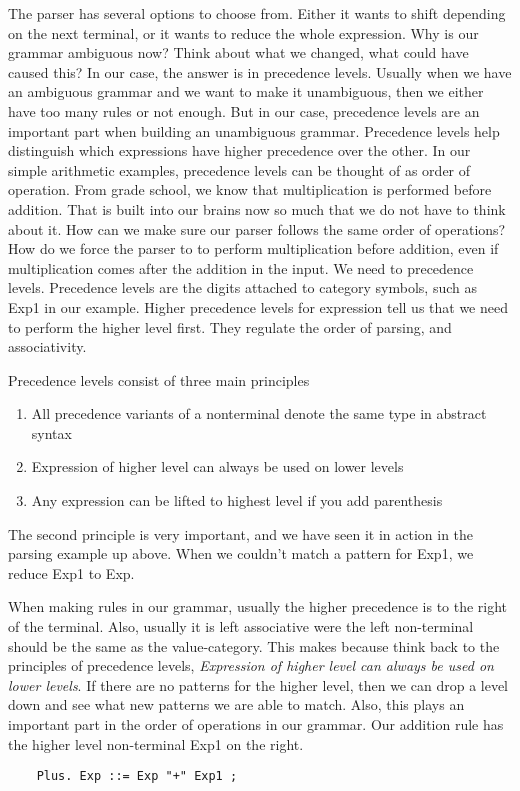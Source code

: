 \documentclass{article}
\begin{document}
\noindent
The parser has several options to choose from. Either it wants to shift depending on the next terminal, or it wants to reduce the whole expression. 
Why is our grammar ambiguous now? Think about what we changed, what could have caused this? In our case, the answer is in precedence levels. Usually when we have an ambiguous grammar and we want to make it unambiguous, then we either have too many rules or not enough. But in our case, precedence levels are an important part when building an unambiguous grammar. Precedence levels help distinguish which expressions have higher precedence over the other. In our simple arithmetic examples, precedence levels can be thought of as order of operation. From grade school, we know that multiplication is performed before addition. That is built into our brains now so much that we do not have to think about it. How can we make sure our parser follows the same order of operations? How do we force the parser to to perform multiplication before addition, even if multiplication comes after the addition in the input. We need to precedence levels. Precedence levels are the digits attached to category symbols, such as Exp1 in our example\cite{IPL}. Higher precedence levels for expression tell us that we need to perform the higher level first. They regulate the order of parsing, and associativity. 

\medskip\noindent
Precedence levels consist of three main principles
\begin{enumerate}
    \item All precedence variants of a nonterminal denote the same type in abstract syntax
    \item Expression of higher level can always be used on lower levels
    \item Any expression can be lifted to highest level if you add parenthesis\cite{IPL}
\end{enumerate}

\medskip\noindent
The second principle is very important, and we have seen it in action in the parsing example up above. When we couldn't match a pattern for Exp1, we reduce Exp1 to Exp. 

\medskip\noindent
When making rules in our grammar, usually the higher precedence is to the right of the terminal. Also, usually it is left associative were the left non-terminal should be the same as the value-category. This makes because think back to the principles of precedence levels, \textit{Expression of higher level can always be used on lower levels}. If there are no patterns for the higher level, then we can drop a level down and see what new patterns we are able to match. Also, this plays an important part in the order of operations in our grammar. Our addition rule has the higher level non-terminal Exp1 on the right.
 \begin{lstlisting}
    Plus. Exp ::= Exp "+" Exp1 ;
 \end{lstlisting}
\end{document}
